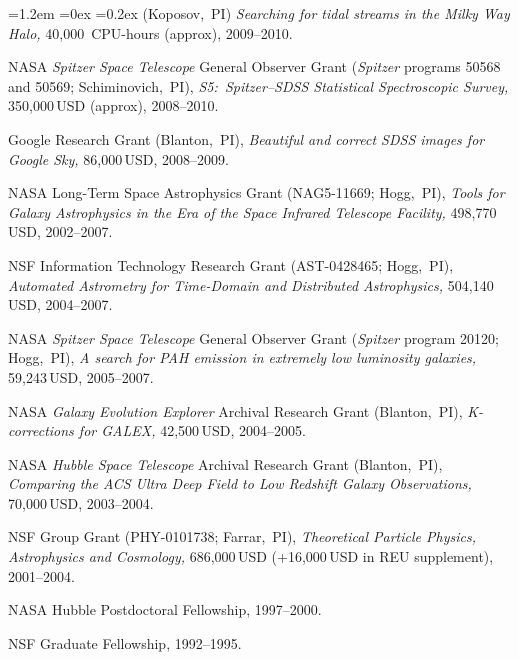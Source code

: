 \documentclass[10pt,letterpaper]{article}
\newcommand{\acronym}[1]{{\small{#1}}}
\newcommand{\project}[1]{\textsl{#1}}
\newcommand{\usd}[1]{{#1}\,\acronym{USD}}
\newcommand{\grantnumber}[2]{{\footnotesize{#1}}; #2,~\acronym{PI}}
\newcounter{refpubnum}
\newcommand{\hogglist}{%
    \rightmargin=0in
    \leftmargin=1.2em
    \topsep=0ex
    \partopsep=0pt
    \itemsep=0.2ex
    \parsep=0pt
    \itemindent=-1.0\leftmargin
    \listparindent=0.0\leftmargin
    \settowidth{\labelsep}{~}
    \usecounter{refpubnum}
  }
\begin{document}
\begin{list}{}{\hogglist}
(Koposov,~\acronym{PI})
\textit{Searching for tidal streams in the Milky Way Halo,}
40,000~\acronym{CPU}-hours (approx), 2009--2010.
\item
\acronym{NASA} \project{Spitzer Space Telescope} General Observer Grant
(\project{Spitzer} programs {\footnotesize{50568}} and {\footnotesize{50569}}; Schiminovich,~\acronym{PI}),
\textit{\acronym{S5}:\ \project{Spitzer}--\project{\acronym{SDSS}} Statistical Spectroscopic Survey,}
\usd{350,000} (approx), 2008--2010.
\item
Google Research Grant
(Blanton,~\acronym{PI}), 
\textit{Beautiful and correct \project{\acronym{SDSS}} images for \project{Google Sky},}
\usd{86,000}, 2008--2009.
\item
\acronym{NASA} Long-Term Space Astrophysics Grant
(\grantnumber{NAG5-11669}{Hogg}),
\textit{Tools for Galaxy Astrophysics in the Era of the
\project{Space Infrared Telescope Facility,}}
\usd{498,770}, 2002--2007.
\item
\acronym{NSF} Information Technology Research Grant
(\grantnumber{AST-0428465}{Hogg}),
\textit{Automated Astrometry for Time-Domain and Distributed
Astrophysics,}
\usd{504,140}, 2004--2007.
\item
\acronym{NASA} \project{Spitzer Space Telescope} General Observer Grant
(\project{Spitzer} program {\footnotesize{20120}}; Hogg,~\acronym{PI}),
\textit{A search for \acronym{PAH} emission in extremely low luminosity galaxies,}
\usd{59,243}, 2005--2007.
\item
\acronym{NASA} \project{Galaxy Evolution Explorer} Archival Research Grant
(Blanton,~\acronym{PI}),
\textit{K-corrections for \acronym{GALEX},}
\usd{42,500}, 2004--2005.
\item
\acronym{NASA} \project{Hubble Space Telescope} Archival Research Grant
(Blanton,~\acronym{PI}),
\textit{Comparing the ACS Ultra Deep Field to Low Redshift Galaxy Observations,}
\usd{70,000}, 2003--2004.
\item
\acronym{NSF} Group Grant
(\grantnumber{PHY-0101738}{Farrar}),
\textit{Theoretical Particle Physics, Astrophysics and Cosmology,}
\usd{686,000} (+\usd{16,000} in \acronym{REU} supplement), 2001--2004.
\item
\acronym{NASA} Hubble Postdoctoral Fellowship, 1997--2000.
\item
\acronym{NSF} Graduate Fellowship, 1992--1995.
\end{list}
\end{document}
